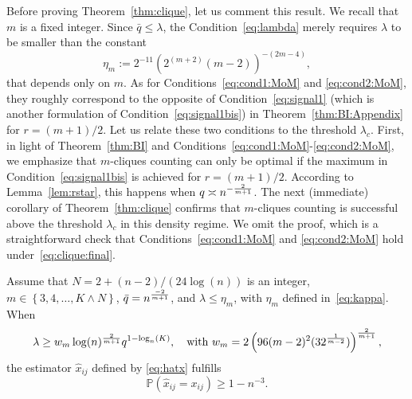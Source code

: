 \documentclass[final]{colt2026}
\newcommand{\1}{\mathbf{1}}
\newcommand{\ch}[1]{\textcolor{green}{#1}}
\newcommand{\bbP}{\mathbb{P}}
\newcommand{\pa}[1]{\left(#1\right)}
\newcommand{\ac}[1]{\left\{#1\right\}}
\begin{document}
Before proving Theorem~\ref{thm:clique}, let us comment this result. We recall that $m$ is a fixed integer.
Since $\bar q \leq \lambda$, the Condition~\eqref{eq:lambda} merely requires $\lambda$ to be smaller than the constant 
\begin{equation}\label{eq:kappa}
\eta_{m}:=2^{-11}\pa{2^{(m+2)}(m-2)}^{-(2m-4)},
\end{equation}
that  depends only on $m$. As for Conditions~\eqref{eq:cond1:MoM} and \eqref{eq:cond2:MoM}, they  roughly correspond to the opposite of Condition~\eqref{eq:signal1} (which is another formulation of Condition~\eqref{eq:signal1bis}) in 
Theorem~\ref{thm:BI:Appendix} for $r=(m+1)/2$. Let us relate these two conditions to the threshold $\lambda_{c}$.
First, in light of Theorem~\ref{thm:BI} and Conditions~\eqref{eq:cond1:MoM}-\eqref{eq:cond2:MoM}, we emphasize that $m$-cliques counting can  only be optimal if the maximum in Condition~\eqref{eq:signal1bis}  is achieved for $r= (m+1)/2$. 
According to Lemma~\ref{lem:rstar}, this happens when $ q \asymp n^{-{2\over m+1}}$.
The next (immediate) corollary of Theorem~\ref{thm:clique} confirms that $m$-cliques counting is successful above the threshold $\lambda_{c}$ in this density regime. We omit the proof, which is a straightforward check that Conditions~\eqref{eq:cond1:MoM} and \eqref{eq:cond2:MoM} hold under~\eqref{eq:clique:final}.
 
\begin{corollary}\label{cor:cliques}
Assume that $N=2+(n-2)/(24\log(n))$ is an integer,  $m\in \ac{3,4,\ldots, K\wedge N}$, $\bar q=n^{-2\over m+1}$, and $\lambda\leq \eta_{m}$, with $\eta_{m}$ defined in~\eqref{eq:kappa}. When
\begin{equation}\label{eq:clique:final}
\lambda \geq w_{m} \log(n)^{2\over m+1}  q^{1-\log_{n}(K)},\quad \text{with}\  w_{m}=2\pa{96(m-2)^2(32^{1\over m-2})}^{2\over m+1},
\end{equation}
the estimator $\hat x_{ij}$ defined by \eqref{eq:hatx} fulfills
$$\bbP\pa{\hat x_{ij}=x_{ij}}\geq 1-n^{-3}.$$ 
\end{corollary}
  
\end{document}
